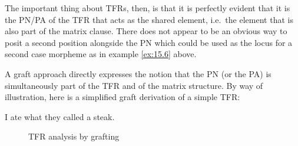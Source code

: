 \documentclass[output=paper]{langsci/langscibook}
\begin{document}
\begin{refcontext}
The important thing about \glspl{TFR}, then, is that it is perfectly evident
that it is the \gls{PN}/PA of the \gls{TFR} that acts as the shared element,
i.e.\ the element that is also part of the matrix clause. There does not appear
to be an obvious way to posit a second position alongside the \gls{PN} which
could be used as the locus for a second case morpheme as in example \eqref{ex:15.6} above.

A graft approach directly expresses the notion that the \gls{PN} (or the PA) is
simultaneously part of the \gls{TFR} and of the matrix structure. By way of
illustration, here is a simplified graft derivation of a simple \gls{TFR}:

\ea\label{ex:15.23}
    I ate what they called a steak.
\z\largerpage[2]

\begin{figure}[H]
    \caption{\label{fig:ex:15.24}TFR analysis by grafting}
\end{figure}
\end{refcontext}
\end{document}
